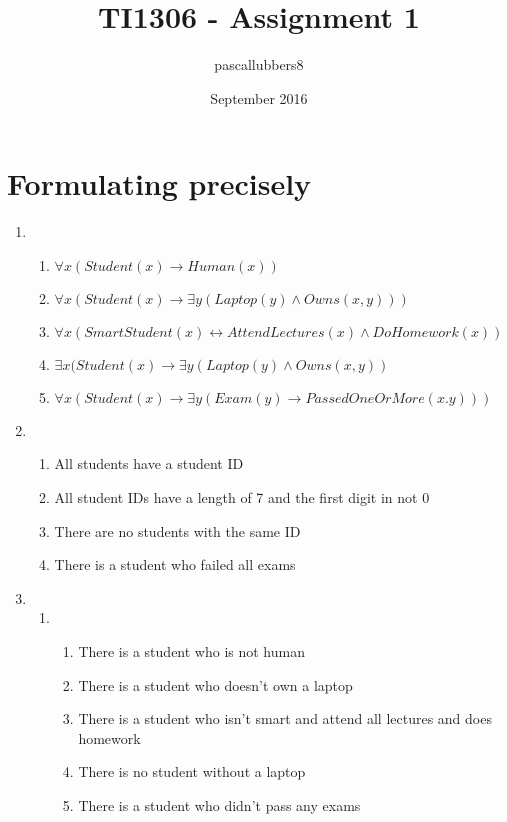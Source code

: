 \documentclass{article}
\title{TI1306 - Assignment 1}
\author{pascallubbers8 }
\date{September 2016}
\begin{document}
\maketitle

\section{Formulating precisely}

\begin{enumerate}[label=(\alph*)]

    \item
    \begin{enumerate}[label=\roman*.]
      \item $\forall x(Student(x) \rightarrow Human(x))$
      \item $\forall x(Student(x) \rightarrow \exists y (Laptop(y) \wedge Owns(x,y)))$
      \item $\forall x(SmartStudent(x) \leftrightarrow AttendLectures(x) \wedge DoHomework(x))$
      \item $\exists x(Student(x) \rightarrow \exists y(Laptop(y) \wedge Owns(x,y))$
      \item $\forall x(Student(x) \rightarrow \exists y(Exam(y) \rightarrow PassedOneOrMore(x.y)))$
    \end{enumerate}
    
    \item
    \begin{enumerate}[label=\roman*.]
      \item All students have a student ID
      \item All student IDs have a length of 7 and the first digit in not 0
      \item There are no students with the same ID
      \item There is a student who failed all exams
    \end{enumerate}
    
    \item
    \begin{enumerate}[label=(\alph*)]
        \item 
        \begin{enumerate}[label=\roman*.]
          \item There is a student who is not human
          \item There is a student who doesn't own a laptop
          \item There is a student who isn't smart and attend all lectures and does homework
          \item There is no student without a laptop
          \item There is a student who didn't pass any exams
        \end{enumerate}
        

\end{enumerate}
\end{enumerate}
\end{document}
